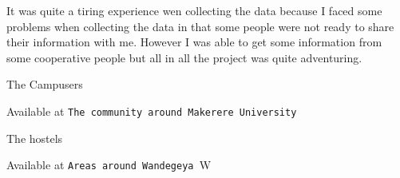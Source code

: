 \documentclass[14pt]{article}
\begin{document}
It was quite a tiring experience wen collecting the data because I faced some problems when collecting the data in that some people were not ready to share their information with me. However I was able to get some information from some cooperative people but all in all the project was quite adventuring.

\begin{thebibliography}{10}

 The Campusers

Available at \texttt{The community around Makerere University }

 The hostels

Available at \texttt{Areas around Wandegeya }W



\end{thebibliography}
\end{document}
